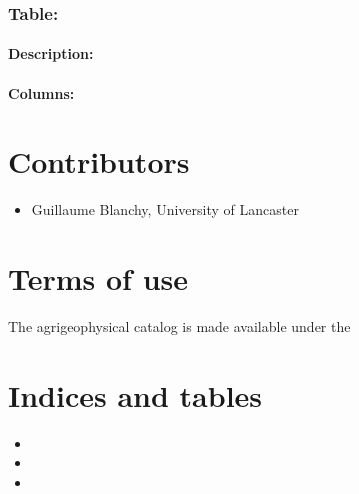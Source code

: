 \documentclass[letterpaper,10pt,english]{sphinxmanual}
\begin{document}
\subsection{Table: }
\label{\detokenize{schema_documentation:table-sampling}}\label{\detokenize{schema_documentation:section-1}}

\subsubsection{Description:}
\label{\detokenize{schema_documentation:description-5}}\label{\detokenize{schema_documentation:id21}}

\subsubsection{Columns:}
\label{\detokenize{schema_documentation:columns-6}}\label{\detokenize{schema_documentation:id22}}\label{\detokenize{schema_documentation:section-2}}

\chapter{Contributors}
\label{\detokenize{contibutors:contributors}}\label{\detokenize{contibutors::doc}}\begin{itemize}
\item {} 
\sphinxAtStartPar
Guillaume Blanchy, University of Lancaster

\end{itemize}


\chapter{Terms of use}
\label{\detokenize{terms_of_use:terms-of-use}}\label{\detokenize{terms_of_use::doc}}
\sphinxAtStartPar
The agrigeophysical catalog is made available under the 


\chapter{Indices and tables}
\label{\detokenize{index:indices-and-tables}}\begin{itemize}
\item {} 
\sphinxAtStartPar
{}

\item {} 
\sphinxAtStartPar
{}

\item {} 
\sphinxAtStartPar
{}

\end{itemize}
\end{document}
